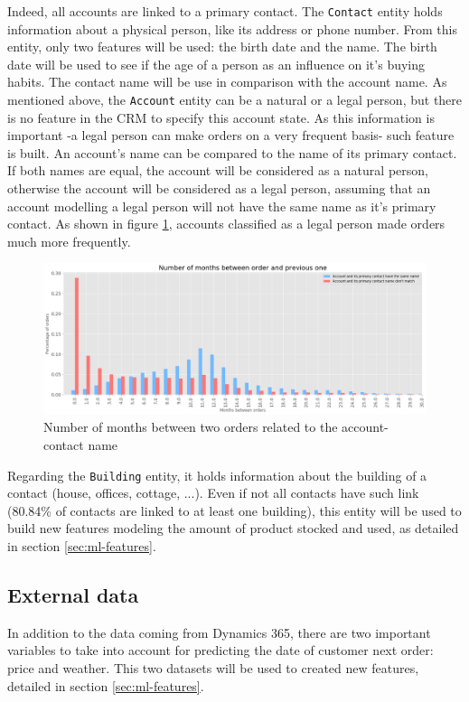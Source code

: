 Indeed, all accounts are linked to a primary contact. The \texttt{Contact} entity holds information about a physical person, like its address or phone number. From this entity, only two features will be used: the birth date and the name. The birth date will be used to see if the age of a person as an influence on it's buying habits. The contact name will be use in comparison with the account name. As mentioned above, the \texttt{Account} entity can be a natural or a legal person, but there is no feature in the CRM to specify this account state. As this information is important -a legal person can make orders on a very frequent basis- such feature is built. An account's name can be compared to the name of its primary contact. If both names are equal, the account will be considered as a natural person, otherwise the account will be considered as a legal person, assuming that an account modelling a legal person will not have the same name as it's primary contact. As shown in figure \ref{fig:account-contact-name-orders}, accounts classified as a legal person made orders much more frequently.

\begin{figure}[h]
    \centering
    \includegraphics[width=15cm]{images/account-contact-name-orders.png}
    \caption[Account and contact's name influence of order's frequency]{Number of months between two orders related to the account-contact name}
    \label{fig:account-contact-name-orders}
\end{figure}

Regarding the \texttt{Building} entity, it holds information about the building of a contact (house, offices, cottage, ...). Even if not all contacts have such link (80.84\% of contacts are linked to at least one building), this entity will be used to build new features modeling the amount of product stocked and used, as detailed in section \ref{sec:ml-features}.


\subsection{External data}\label{sec:external-data}
In addition to the data coming from Dynamics 365, there are two important variables to take into account for predicting the date of customer next order: price and weather. This two datasets will be used to created new features, detailed in section \ref{sec:ml-features}.


